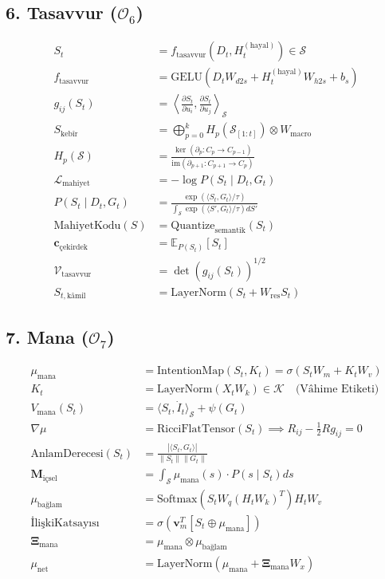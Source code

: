 \documentclass[11pt, a4paper]{article}
\begin{document}
\subsection{6. Tasavvur ($\mathcal{O}_6$)}
\begin{align}
S_t &= f_{\text{tasavvur}}(D_t, H_t^{(\text{hayal})}) \in \mathcal{S} \\
f_{\text{tasavvur}} &= \text{GELU}(D_t W_{d2s} + H_t^{(\text{hayal})} W_{h2s} + b_s) \\
g_{ij}(S_t) &= \left\langle \frac{\partial S_t}{\partial u_i}, \frac{\partial S_t}{\partial u_j} \right\rangle_{\mathcal{S}} \\
S_{\text{kebîr}} &= \bigoplus_{p=0}^k H_p\left(\mathcal{S}_{[1:t]}\right) \otimes W_{\text{macro}} \\
H_p(\mathcal{S}) &= \frac{\ker(\partial_p: C_p \to C_{p-1})}{\text{im}(\partial_{p+1}: C_{p+1} \to C_p)} \\
\mathcal{L}_{\text{mahiyet}} &= -\log P(S_t \mid D_t, G_t) \\
P(S_t \mid D_t, G_t) &= \frac{\exp(\langle S_t, G_t \rangle / \tau)}{\int_{\mathcal{S}} \exp(\langle S', G_t \rangle / \tau) dS'} \\
\text{MahiyetKodu}(S) &= \text{Quantize}_{\text{semantik}}(S_t) \\
\mathbf{c}_{\text{çekirdek}} &= \mathbb{E}_{P(S_t)}[S_t] \\
\mathcal{V}_{\text{tasavvur}} &= \det(g_{ij}(S_t))^{1/2} \\
S_{t, \text{kâmil}} &= \text{LayerNorm}(S_t + W_{\text{res}} S_t)
\end{align}

\subsection{7. Mana ($\mathcal{O}_7$)}
\begin{align}
\mu_{\text{mana}} &= \text{IntentionMap}(S_t, K_t) = \sigma(S_t W_m + K_t W_v) \\
K_t &= \text{LayerNorm}(X_t W_k) \in \mathcal{K} \quad \text{(Vâhime Etiketi)} \\
V_{\text{mana}}(S_t) &= \langle S_t, \dot{I}_t \rangle_{\mathcal{S}} + \psi(G_t) \\
\nabla \mu &= \text{RicciFlatTensor}(S_t) \implies R_{ij} - \frac{1}{2} R g_{ij} = 0 \\
\text{AnlamDerecesi}(S_t) &= \frac{|\langle S_t, G_t \rangle|}{\|S_t\| \|G_t\|} \\
\mathbf{M}_{\text{içsel}} &= \int_{\mathcal{S}} \mu_{\text{mana}}(s) \cdot P(s \mid S_t) ds \\
\mu_{\text{bağlam}} &= \text{Softmax}(S_t W_q (H_t W_k)^T) H_t W_v \\
\text{İlişkiKatsayısı} &= \sigma(\mathbf{v}_m^T [S_t \oplus \mu_{\text{mana}}]) \\
\mathbf{\Xi}_{\text{mana}} &= \mu_{\text{mana}} \otimes \mu_{\text{bağlam}} \\
\mu_{\text{net}} &= \text{LayerNorm}(\mu_{\text{mana}} + \mathbf{\Xi}_{\text{mana}} W_x)
\end{align}
\end{document}
